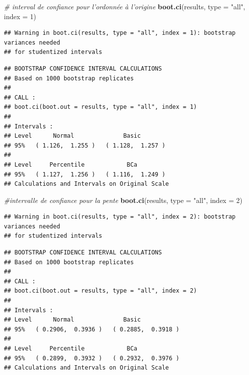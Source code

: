 \documentclass[12pt,]{book}
\newenvironment{Shaded}{\begin{snugshade}}{\end{snugshade}}
\newcommand{\CommentTok}[1]{\textcolor[rgb]{0.37,0.37,0.37}{\textit{#1}}}
\newcommand{\DataTypeTok}[1]{\textcolor[rgb]{0.27,0.27,0.27}{#1}}
\newcommand{\DecValTok}[1]{\textcolor[rgb]{0.06,0.06,0.06}{#1}}
\newcommand{\KeywordTok}[1]{\textcolor[rgb]{0.27,0.27,0.27}{\textbf{#1}}}
\newcommand{\NormalTok}[1]{#1}
\newcommand{\StringTok}[1]{\textcolor[rgb]{0.5,0.5,0.5}{#1}}
\begin{document}
\begin{Shaded}
\begin{Highlighting}[]
\CommentTok{# interval de confiance pour l'ordonnée à l'origine}
\KeywordTok{boot.ci}\NormalTok{(results, }\DataTypeTok{type =} \StringTok{"all"}\NormalTok{, }\DataTypeTok{index =} \DecValTok{1}\NormalTok{)}
\end{Highlighting}
\end{Shaded}

\begin{verbatim}
## Warning in boot.ci(results, type = "all", index = 1): bootstrap variances needed
## for studentized intervals
\end{verbatim}

\begin{verbatim}
## BOOTSTRAP CONFIDENCE INTERVAL CALCULATIONS
## Based on 1000 bootstrap replicates
## 
## CALL : 
## boot.ci(boot.out = results, type = "all", index = 1)
## 
## Intervals : 
## Level      Normal              Basic         
## 95%   ( 1.126,  1.255 )   ( 1.128,  1.257 )  
## 
## Level     Percentile            BCa          
## 95%   ( 1.127,  1.256 )   ( 1.116,  1.249 )  
## Calculations and Intervals on Original Scale
\end{verbatim}

\begin{Shaded}
\begin{Highlighting}[]
\CommentTok{#intervalle de confiance pour la pente}
\KeywordTok{boot.ci}\NormalTok{(results, }\DataTypeTok{type =} \StringTok{"all"}\NormalTok{, }\DataTypeTok{index =} \DecValTok{2}\NormalTok{)}
\end{Highlighting}
\end{Shaded}

\begin{verbatim}
## Warning in boot.ci(results, type = "all", index = 2): bootstrap variances needed
## for studentized intervals
\end{verbatim}

\begin{verbatim}
## BOOTSTRAP CONFIDENCE INTERVAL CALCULATIONS
## Based on 1000 bootstrap replicates
## 
## CALL : 
## boot.ci(boot.out = results, type = "all", index = 2)
## 
## Intervals : 
## Level      Normal              Basic         
## 95%   ( 0.2906,  0.3936 )   ( 0.2885,  0.3918 )  
## 
## Level     Percentile            BCa          
## 95%   ( 0.2899,  0.3932 )   ( 0.2932,  0.3976 )  
## Calculations and Intervals on Original Scale
\end{verbatim}
\end{document}
